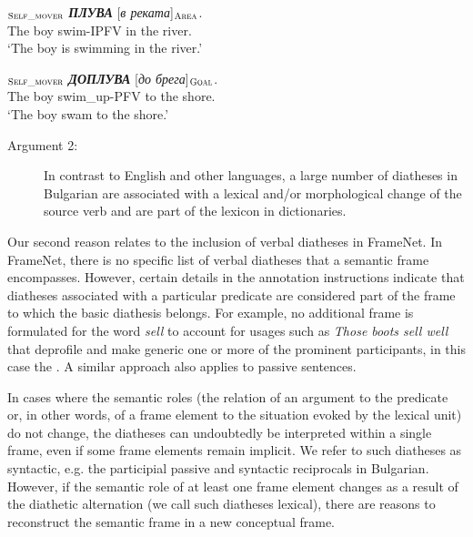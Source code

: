 \documentclass[output=paper,colorlinks,citecolor=brown]{langscibook}
\begin{document}
 \begin{exe}
 \ex  \label{ch01:ex:07}
 $_{\text{\textsc{Self\_mover}}}$   \textit{\textbf{ПЛУВА}}  [\textit{в реката}]$_{\text{\textsc{Area}}}$.\\
{The boy}  swim-IPFV {in the river}. \\
 \glt `The boy is swimming in the river.' 
 \end{exe}
 
  \begin{exe}
 \ex  \label{ch01:ex:08}
 $_{\text{\textsc{Self\_mover}}}$   \textit{\textbf{ДОПЛУВА}}  [\textit{до брега}]$_{\text{\textsc{Goal}}}$.\\
{The boy}  swim\_up-PFV {to the shore}. \\
 \glt `The boy swam to the shore.' 
 \end{exe}

\begin{description}
    \item[Argument 2:] In contrast to English and other languages, a large number of diatheses in Bulgarian are associated with a lexical and/or morphological change of the source verb and are part of the lexicon in dictionaries.
\end{description}
Our second reason relates to the inclusion of verbal diatheses in FrameNet. In FrameNet, there is no specific list of verbal diatheses that a semantic frame encompasses. However, certain details in the annotation instructions indicate that diatheses associated with a particular predicate are considered part of the frame to which the basic diathesis belongs.  For example, no additional frame is formulated for the word \emph{sell} to account for usages such as \emph{Those boots sell well} that deprofile and make generic one or more of the prominent participants, in this case the  \citep[12]{Ruppenhofer2016}. A similar approach also applies to passive sentences.

In cases where the semantic roles (the relation of an argument to the predicate or, in other words, of a frame element to the situation evoked by the lexical unit) do not change, the diatheses can undoubtedly be interpreted within a single frame, even if some frame elements remain implicit. We refer to such diatheses as syntactic, e.g. the participial passive and syntactic reciprocals in Bulgarian. However, if the semantic role of at least one frame element changes as a result of the diathetic alternation (we call such diatheses lexical), there are reasons to reconstruct the semantic frame in a new conceptual frame.
\end{document}
